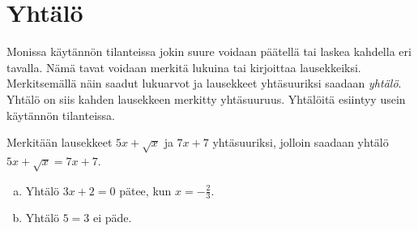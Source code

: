 \chapter{Yhtälö}

Monissa käytännön tilanteissa jokin suure voidaan päätellä tai laskea kahdella eri tavalla. Nämä tavat voidaan merkitä lukuina tai kirjoittaa lausekkeiksi. Merkitsemällä näin saadut lukuarvot ja lausekkeet yhtäsuuriksi saadaan \emph{yhtälö}. Yhtälö on siis kahden lausekkeen merkitty yhtäsuuruus. Yhtälöitä esiintyy usein käytännön tilanteissa.

\begin{esimerkki}
Merkitään lausekkeet $5x+\sqrt{x}$ ja $7x+7$ yhtäsuuriksi, jolloin saadaan
yhtälö $5x+\sqrt{x} = 7x+7$.
\end{esimerkki}


\begin{esimerkki}
\begin{enumerate}[a)]
\item Yhtälö $3x + 2 = 0$ pätee, kun $x = - \frac{2}{3}$.
\item Yhtälö $5 = 3$ ei päde.
\end{enumerate}
\end{esimerkki}


